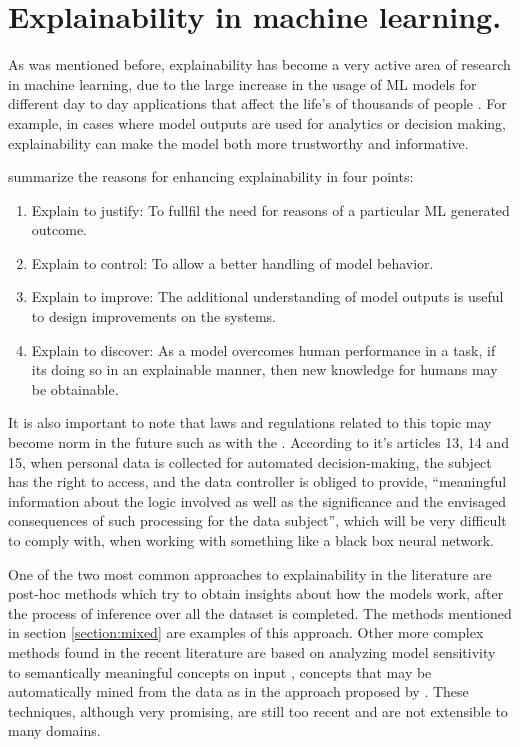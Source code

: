 \section{ Explainability in machine learning.}

As was mentioned before, explainability has become a very active area of research
in machine learning, due to the large increase in the usage of ML models
for different day to day applications that affect the life's of thousands of people
\cite{ras_explanation}. For example, in cases where model outputs are used for analytics or decision
making, explainability can make the model both more trustworthy and informative.

 summarize the reasons for enhancing explainability in four points:

\begin{enumerate}
	\item Explain to justify: To fullfil the need for reasons of a particular ML
	generated outcome.
	\item Explain to control: To allow a better handling of model behavior.
	\item Explain to improve: The additional understanding of model outputs is useful
	to design improvements on the systems.
	\item Explain to discover: As a model overcomes human performance in a task, if its
	doing so in an explainable manner, then new knowledge for humans may be obtainable.

\end{enumerate}

It is also important to note that laws and regulations related to this topic may become norm
in the future such as with the . According to it's articles
13, 14 and 15, when personal data is collected for automated decision-making,
the subject has the right to access, and the data controller is obliged to provide,
“meaningful information about the logic involved  as well as the significance and the envisaged
consequences of such processing for the data subject”, which will be very difficult to comply with,
when working with something like a black box neural network.

One of the two most common approaches to explainability in the literature are post-hoc methods
\cite{adadi_xai} which try to obtain insights about how the models work, after the process of
inference over all the dataset is completed. The methods mentioned in section
\ref{section:mixed} are examples of this approach. Other more complex methods found in the recent literature
are based on analyzing model sensitivity to semantically meaningful concepts on input \cite{kim_tcav, shi_concept},
concepts that may be automatically mined from the data as in the approach proposed by . These techniques, although
very promising, are still too recent and are not extensible to many domains.

